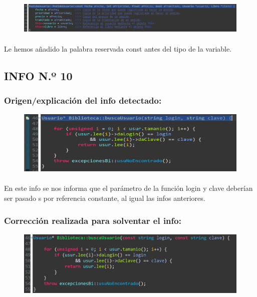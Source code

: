 			\begin{figure}[H]
				\centering
				\includegraphics[scale=0.55]{img/esteban15.png}
				\label{esteban15}
			\end{figure}
		
			\paragraph{}Le hemos añadido la palabra reservada const antes del tipo de la variable.
			
	\subsection{INFO N.º 10}
	
		\subsubsection{Origen/explicación del info detectado:}
		
			\begin{figure}[H]
				\centering
				\includegraphics[scale=0.55]{img/esteban16.png}
				\label{esteban16}
			\end{figure}
		
			\paragraph{}En este info se nos informa que el parámetro de la función login y clave deberían ser pasado s por referencia constante, al igual las infos anteriores.
			
		\subsubsection{Corrección realizada para solventar el info:}
		
			\begin{figure}[H]
				\centering
				\includegraphics[scale=0.55]{img/esteban17.png}
				\label{esteban17}
			\end{figure}
		
